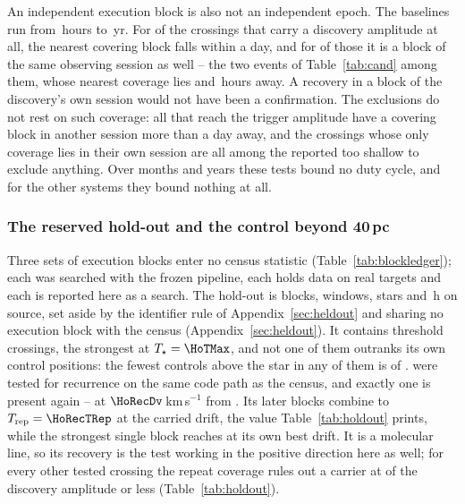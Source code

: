 An independent execution block is also not an independent epoch. The baselines run from \RcSepMinH\,hours to \RcSepMaxYr\,yr. For
\RcNSepSameDay{} of the \RcNExclPoss{} crossings that carry a discovery
amplitude at all, the nearest covering block falls within a day, and for
\QcNHazard{} of those it is a block of the same observing session as well --
the two events of Table~\ref{tab:cand} among them, whose nearest coverage lies
\QcEvSepOneH{} and \QcEvSepTwoH\,hours away. A recovery in a block of the
discovery's own session would not have been a confirmation. The exclusions do
not rest on such coverage: all \HjNPowerHi{} that reach the trigger amplitude
have a covering block in another session more than a day away, and the
\QfNExclSameOnlyWord{} crossings whose only coverage lies in their own session
are all among the \HjNPowerLo{} reported too shallow to exclude anything.
Over months and years these tests
bound no duty cycle, and for the other \ZcNoRepSys{} systems they bound
nothing at all.

\subsubsection{The reserved hold-out and the control beyond 40\,pc}
\label{sec:holdoutsearch}

Three sets of execution blocks enter no census statistic
(Table~\ref{tab:blockledger}); each was searched with the frozen pipeline, each
holds data on real targets and each is reported here as a search. The hold-out is \HoNBlock{} blocks, \HoNWin{} windows, \HoNStar{} stars
and \HoHours\,h on source, set aside by the identifier rule of
Appendix~\ref{sec:heldout} and sharing no execution block with the census
(Appendix~\ref{sec:heldout}). It contains \HoNCross{} threshold crossings,
the strongest at $T_\star=\HoTMax$, and not one of them outranks its own
control positions: the fewest controls above the star in any of them is
\HoNCtrlMin{} of \NCtrl. \HoNTested{} were tested for recurrence on the same
code path as the census, and exactly one is present again -- \HoRecStar{} at
$\HoRecDv$\,km\,s$^{-1}$ from \HoRecLine. Its \HoRecNRep{} later blocks
combine to $T_{\rm rep}=\HoRecTRep$ at the carried drift, the value
Table~\ref{tab:holdout} prints, while the strongest single block reaches
\HoRecTAnyDrift{} at its own best drift. It is a molecular line, so its
recovery is the test working in the positive direction here as well; for
every other tested crossing the repeat coverage rules out a carrier at
\HoFracMax{} of the discovery amplitude or less (Table~\ref{tab:holdout}).

